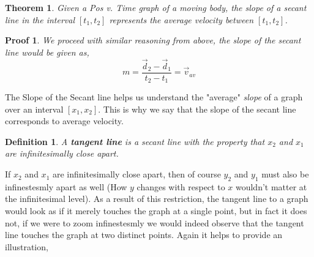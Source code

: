 \documentclass[12pt]{article}
\theoremstyle{break}
\newtheorem{thm}{Theorem}[subsection]
\newtheorem*{pf}{Proof}
\newtheorem{defn}{Definition}[subsection]
\begin{document}
\begin{thm}
Given a Pos v. Time graph of a moving body, the slope of a secant line in the interval $[t_1,t_2]$ represents the average velocity between $[t_1,t_2]$.
\end{thm}
\begin{pf}
	We proceed with similar reasoning from above, the slope of the secant line would be given as,
	$$m = \frac{\vec d_2 - \vec d_1}{t_2 - t_1} = \vec v_{av}$$
\end{pf}
The Slope of the Secant line helps us understand the "average" \emph{slope} of a graph over an interval $[x_1,x_2]$. This is why we say that the slope of the secant line corresponds to average velocity.
\begin{defn}
A \textbf{tangent line} is a secant line with the property that $x_2$ and $x_1$ are infinitesimally close apart.
\end{defn}
If $x_2$ and $x_1$ are infinitesimally close apart, then of course $y_2$ and $y_1$ must also be infinestesmly apart as well (How $y$ changes with respect to $x$ wouldn't matter at the infinitesimal level). As a result of this restriction, the tangent line to a graph would look as if it merely touches the graph at a single point, but in fact it does not, if we were to zoom infinestesmly we would indeed observe that the tangent line touches the graph at two distinct points. Again it helps to provide an illustration,


\begin{center}
\end{center}
\end{document}
